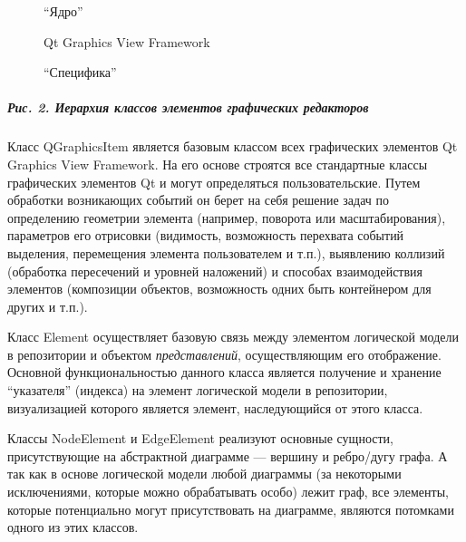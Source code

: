 \documentclass[a5paper]{article}
\begin{document}
\begin{figure}
\begin{center}
\begin{minipage}{2.849cm}

``Ядро''
\end{minipage}
\end{center}
\end{figure}
\begin{figure}
\begin{center}
\begin{minipage}{6.024cm}
{
Qt Graphics View Framework}
\end{minipage}
\end{center}
\end{figure}
\begin{figure}
\begin{center}
\begin{minipage}{3.801cm}

``Специфика''
\end{minipage}
\end{center}
\end{figure}
\subparagraph[Рис. 2. Иерархия классов элементов графических
редакторов]{Рис. 2. Иерархия классов элементов графических редакторов}


Класс QGraphicsItem является базовым классом всех графических элементов Qt
Graphics View Framework. На его основе строятся все
стандартные классы графических элементов Qt
и могут определяться пользовательские. Путем обработки возникающих
событий он берет на себя решение задач по определению геометрии
элемента (например, поворота или масштабирования), параметров его
отрисовки (видимость, возможность перехвата событий выделения,
перемещения элемента пользователем и т.п.), выявлению коллизий
(обработка пересечений и уровней наложений) и способах взаимодействия
элементов (композиции объектов, возможность одних быть контейнером для
других и т.п.).

Класс Element осуществляет базовую связь
между элементом логической модели в репозитории и объектом
\textit{представлений}, осуществляющим его отображение. Основной
функциональностью данного класса является получение и хранение
``указателя'' (индекса) на элемент логической модели в репозитории,
визуализацией которого является элемент, наследующийся от этого класса.

Классы NodeElement и EdgeElement реализуют основные сущности,
присутствующие на абстрактной диаграмме --- вершину и ребро/дугу графа. А
так как в основе логической модели любой диаграммы (за некоторыми
исключениями, которые можно обрабатывать особо) лежит граф, все
элементы, которые потенциально могут присутствовать на диаграмме,
являются потомками одного из этих классов.
\end{document}
